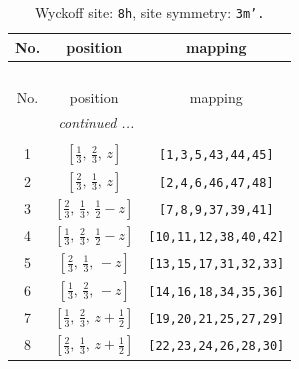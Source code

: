 \documentclass[fleqn,8pt]{jsarticle}
\begin{document}
\begin{longtable}{ccc}
\caption{Wyckoff site: {\tt 8h}, site symmetry: {\tt 3m'.}}
 \\
 \hline \hline
No. & position & mapping \\ \hline \endfirsthead

\multicolumn{2}{l}{\tablename\ \thetable{}} \\
 \hline \hline
No. & position & mapping \\ \hline \endhead

 \hline \hline
\multicolumn{2}{r}{\footnotesize\it continued ...} \\ \endfoot

 \hline \hline
\multicolumn{2}{r}{} \\ \endlastfoot

1 & $\left[ \frac{1}{3},\, \frac{2}{3},\, z \right]$ & {\tt [1,3,5,43,44,45]} \\ \hline
2 & $\left[ \frac{2}{3},\, \frac{1}{3},\, z \right]$ & {\tt [2,4,6,46,47,48]} \\ \hline
3 & $\left[ \frac{2}{3},\, \frac{1}{3},\, \frac{1}{2} - z \right]$ & {\tt [7,8,9,37,39,41]} \\ \hline
4 & $\left[ \frac{1}{3},\, \frac{2}{3},\, \frac{1}{2} - z \right]$ & {\tt [10,11,12,38,40,42]} \\ \hline
5 & $\left[ \frac{2}{3},\, \frac{1}{3},\, - z \right]$ & {\tt [13,15,17,31,32,33]} \\ \hline
6 & $\left[ \frac{1}{3},\, \frac{2}{3},\, - z \right]$ & {\tt [14,16,18,34,35,36]} \\ \hline
7 & $\left[ \frac{1}{3},\, \frac{2}{3},\, z + \frac{1}{2} \right]$ & {\tt [19,20,21,25,27,29]} \\ \hline
8 & $\left[ \frac{2}{3},\, \frac{1}{3},\, z + \frac{1}{2} \right]$ & {\tt [22,23,24,26,28,30]} \\
\end{longtable}
\renewcommand{\arraystretch}{1.2}
\end{document}
